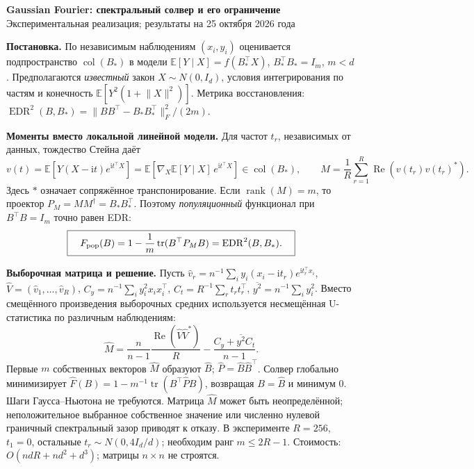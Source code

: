 \documentclass[10pt,a4paper]{article}
\newcommand{\EDR}{\operatorname{EDR}}
\newcommand{\Rea}{\operatorname{Re}}
\newcommand{\norm}[1]{\lVert#1\rVert}
\begin{document}
\begin{center}
  {\large\bfseries Gaussian Fourier: спектральный солвер и его ограничение}\\[2pt]
  {\small Экспериментальная реализация; результаты на 25 октября 2026 года}
\end{center}
\vspace{-5pt}

\textbf{Постановка.}
По независимым наблюдениям $(x_i,y_i)$ оценивается подпространство
$\operatorname{col}(B_*)$ в модели
$\mathbb E[Y\mid X]=f(B_*^\top X)$, $B_*^\top B_*=I_m$, $m<d$.
Предполагаются \emph{известный} закон $X\sim N(0,I_d)$, условия
интегрирования по частям и конечность $\mathbb E[Y^2(1+\norm X^2)]$.
Метрика восстановления:
$\EDR^2(B,B_*)=\norm{BB^\top-B_*B_*^\top}_F^2/(2m)$.

\textbf{Моменты вместо локальной линейной модели.}
Для частот $t_r$, независимых от данных, тождество Стейна даёт
\[
 v(t)=\mathbb E\!\left[Y(X-\mathrm i t)e^{\mathrm i t^\top X}\right]
     =\mathbb E\!\left[\nabla_X\mathbb E[Y\mid X]\,
                         e^{\mathrm i t^\top X}\right]
     \in\operatorname{col}(B_*),
 \qquad M=\frac1R\sum_{r=1}^R\Rea\!\left(v(t_r)v(t_r)^*\right).
\]
Здесь $*$ означает сопряжённое транспонирование.
Если $\operatorname{rank}(M)=m$, то проектор $P_M=MM^\dagger=B_*B_*^\top$.
Поэтому \emph{популяционный} функционал при $B^\top B=I_m$ точно равен EDR:
\[
 \boxed{\quad F_{\rm pop}(B)=1-\frac1m\operatorname{tr}(B^\top P_M B)
                          =\EDR^2(B,B_*) .\quad}
\]

\textbf{Выборочная матрица и решение.}
Пусть $\hat v_r=n^{-1}\sum_i y_i(x_i-\mathrm i t_r)e^{\mathrm i t_r^\top x_i}$,
$\widehat V=(\hat v_1,\ldots,\hat v_R)$,
$C_y=n^{-1}\sum_i y_i^2x_ix_i^\top$, $C_t=R^{-1}\sum_r t_rt_r^\top$,
$\overline{y^2}=n^{-1}\sum_i y_i^2$.
Вместо смещённого произведения выборочных средних используется
несмещённая U-статистика по различным наблюдениям:
\[
 \widehat M=\frac{n}{n-1}\frac{\Rea(\widehat V\widehat V^*)}{R}
                  -\frac{C_y+\overline{y^2}C_t}{n-1}.
\]
Первые $m$ собственных векторов $\widehat M$ образуют $\widehat B$;
$\widehat P=\widehat B\widehat B^\top$.
Солвер глобально минимизирует
$\widehat F(B)=1-m^{-1}\operatorname{tr}(B^\top\widehat P B)$,
возвращая $B=\widehat B$ и минимум $0$.
Шаги Гаусса--Ньютона не требуются.
Матрица $\widehat M$ может быть неопределённой; неположительное выбранное
собственное значение или численно нулевой граничный спектральный зазор
приводят к отказу.
В эксперименте $R=256$, $t_1=0$, остальные
$t_r\sim N(0,4I_d/d)$; необходим ранг $m\le 2R-1$.
Стоимость: $O(ndR+nd^2+d^3)$; матрицы $n\times n$ не строятся.
\end{document}
